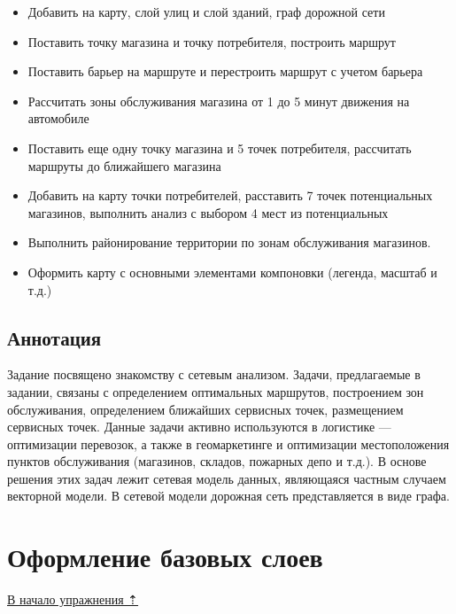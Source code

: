 \documentclass[]{book}
\providecommand{\tightlist}{%
  \setlength{\itemsep}{0pt}\setlength{\parskip}{0pt}}
\theoremstyle{definition}
\theoremstyle{definition}
\theoremstyle{definition}
\theoremstyle{remark}
\begin{document}
\begin{itemize}
\tightlist
\item
  Добавить на карту, слой улиц и слой зданий, граф дорожной сети
\item
  Поставить точку магазина и точку потребителя, построить маршрут
\item
  Поставить барьер на маршруте и перестроить маршрут с учетом барьера
\item
  Рассчитать зоны обслуживания магазина от 1 до 5 минут движения на
  автомобиле
\item
  Поставить еще одну точку магазина и 5 точек потребителя, рассчитать
  маршруты до ближайшего магазина
\item
  Добавить на карту точки потребителей, расставить 7 точек потенциальных
  магазинов, выполнить анализ с выбором 4 мест из потенциальных
\item
  Выполнить районирование территории по зонам обслуживания магазинов.
\item
  Оформить карту с основными элементами компоновки (легенда, масштаб и
  т.д.)
\end{itemize}

\hypertarget{network-analysis-annotation}{%
\subsection{Аннотация}\label{network-analysis-annotation}}

Задание посвящено знакомству с сетевым анализом. Задачи, предлагаемые в
задании, связаны с определением оптимальных маршрутов, построением зон
обслуживания, определением ближайших сервисных точек, размещением
сервисных точек. Данные задачи активно используются в логистике ---
оптимизации перевозок, а также в геомаркетинге и оптимизации
местоположения пунктов обслуживания (магазинов, складов, пожарных депо и
т.д.). В основе решения этих задач лежит сетевая модель данных,
являющаяся частным случаем векторной модели. В сетевой модели дорожная
сеть представляется в виде графа.

\hypertarget{network-analysis-basemap}{%
\section{Оформление базовых слоев}\label{network-analysis-basemap}}

\protect\hyperlink{network-analysis}{В начало упражнения ⇡}
\end{document}
